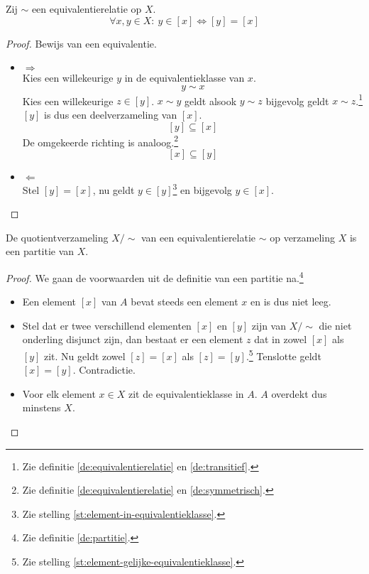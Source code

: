 \documentclass[main.tex]{subfiles}
\begin{document}
\begin{st}
  \label{st:element-gelijke-equivalentieklasse}
  Zij $\sim$ een equivalentierelatie op $X$.
  \[ \forall x,y \in X:\ y \in [x] \Leftrightarrow [y] = [x] \]

  \begin{proof}
    Bewijs van een equivalentie.
    \begin{itemize}
    \item $\Rightarrow$\\
      Kies een willekeurige $y$ in de equivalentieklasse van $x$.
      \[ y \sim x \]
      Kies een willekeurige $z\in [y]$. 
      $x \sim y$ geldt alsook $y \sim z$ bijgevolg geldt $x \sim z$.\footnote{Zie definitie \ref{de:equivalentierelatie} en \ref{de:transitief}.}
      $[y]$ is dus een deelverzameling van $[x]$.
      \[ [y] \subseteq [x] \]
      De omgekeerde richting is analoog.\footnote{Zie definitie \ref{de:equivalentierelatie} en \ref{de:symmetrisch}.}
      \[ [x] \subseteq [y] \]
    \item $\Leftarrow$\\
      Stel $[y] = [x]$, nu geldt $y \in [y]$\footnote{Zie stelling \ref{st:element-in-equivalentieklasse}.} en bijgevolg $y \in [x]$.
    \end{itemize}
  \end{proof}
\end{st}

\begin{st}
  De quotientverzameling $X/\sim$ van een equivalentierelatie $\sim$ op verzameling $X$ is een partitie van $X$.

  \begin{proof}
    We gaan de voorwaarden uit de definitie van een partitie na.\footnote{Zie definitie \ref{de:partitie}.}
    \begin{itemize}
    \item Een element $[x]$ van $A$ bevat steeds een element $x$ en is dus niet leeg.
    \item Stel dat er twee verschillend elementen $[x]$ en $[y]$ zijn van $X/\sim$ die niet onderling disjunct zijn, dan bestaat er een element $z$ dat in zowel $[x]$ als $[y]$ zit. Nu geldt zowel $[z] = [x]$ als  $[z] = [y]$.\footnote{Zie stelling \ref{st:element-gelijke-equivalentieklasse}.}
      Tenslotte geldt $[x] = [y]$. Contradictie.
    \item Voor elk element $x \in X$ zit de equivalentieklasse in $A$. $A$ overdekt dus minstens $X$.
    \end{itemize}
  \end{proof}
\end{st}
\end{document}
